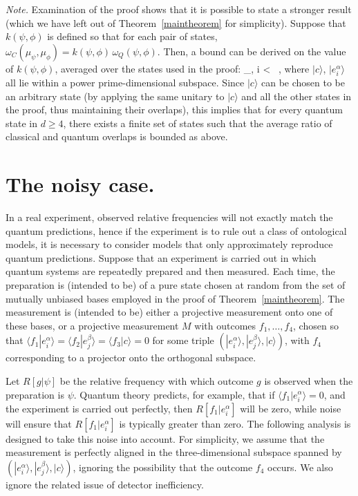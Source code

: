 \textit{Note.} Examination of the proof shows that it is possible to state a stronger result (which we have left out of Theorem~\ref{maintheorem} for simplicity). Suppose that $k(\psi,\phi)$ is defined so that for each pair of states, $\omega_C(\mu_\psi,\mu_\phi) = k(\psi,\phi) \, \omega_Q(\psi,\phi)$. Then, a bound can be derived on the value of $k(\psi,\phi)$, averaged over the states used in the proof: 
\be
\sum_{\alpha, i}  <  \, ,
\ee
where $|c\rangle$, $|e^\alpha_i\rangle$ all lie within a power prime-dimensional subspace. Since $|c\rangle$ can be chosen to be an arbitrary state (by applying the same unitary to $|c\rangle$ and all the other states in the proof, thus maintaining their overlaps), this implies that for every quantum state in $d\geq4$, there exists a finite set of states such that the average ratio of classical and quantum overlaps is bounded as above. 

\section*{The noisy case.} In a real experiment, observed relative frequencies will not exactly match the quantum predictions, hence if the experiment is to rule out a class of ontological models, it is necessary to consider models that only approximately reproduce quantum predictions. Suppose that an experiment is carried out in which quantum systems are repeatedly prepared and then measured. Each time, the preparation is (intended to be) of a pure state chosen at random from the set of mutually unbiased bases employed in the proof of Theorem~\ref{maintheorem}. The measurement is (intended to be) either a projective measurement onto one of these bases, or a projective measurement $M$ with outcomes $f_1,\ldots, f_4$, chosen so that $\langle f_1 | e^\alpha_i\rangle = \langle f_2 | e^\beta_j\rangle = \langle f_3 | c \rangle = 0$ for some triple $(|e^\alpha_i\rangle , | e^\beta_j \rangle , |c\rangle )$, with $f_4$ corresponding to a projector onto the orthogonal subspace.

Let $R[g|\psi]$ be the relative frequency with which outcome $g$ is observed when the preparation is $\psi$. Quantum theory predicts, for example, that if $\langle f_1|e^\alpha_i\rangle=0$, and the experiment is carried out perfectly, then $R[f_1 | e^\alpha_i]$ will be zero, while noise will ensure that $R[f_1 | e^\alpha_i]$ is typically greater than zero. The following analysis is designed to take this noise into account. For simplicity, we assume that the measurement is perfectly aligned in the three-dimensional subspace spanned by $(|e^\alpha_i\rangle , | e^\beta_j \rangle , |c\rangle )$, ignoring the possibility that the outcome $f_4$ occurs. We also ignore the related issue of detector inefficiency. 

